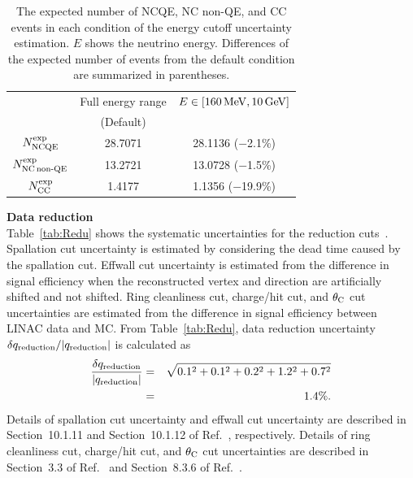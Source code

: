 \begin{table}[h]
	\centering
	\caption[The expected number of NCQE, NC non-QE, and CC events in each condition of the energy cutoff uncertainty estimation]{
	The expected number of NCQE, NC non-QE, and CC events in each condition of the energy cutoff uncertainty estimation.
	$E$ shows the neutrino energy.
	Differences of the expected number of events from the default condition are summarized in parentheses.
	}\label{tab:Cutoff}
	\vs
	\begin{tabular}{ccc} \hline \hline
		                                         & Full energy range & $E\in [160\,{\rm MeV}, 10\,{\rm GeV}]$ \\
		                                         & (Default)         &                                        \\ \hline
		$N^{\rm exp}_{\rm NCQE}$                 & 28.7071           & 28.1136 ($-$2.1\%)                     \\
		$N^{\rm exp}_{\rm NC\,non\mathchar`-QE}$ & 13.2721           & 13.0728 ($-$1.5\%)                     \\
		$N^{\rm exp}_{\rm CC}$                   & 1.4177            & 1.1356 ($-$19.9\%)                     \\ \hline \hline
	\end{tabular}
\end{table}

\textbf{Data reduction}\\
\hs
Table~\ref{tab:Redu} shows the systematic uncertainties for the reduction cuts~\cite{2021Abe}.
Spallation cut uncertainty is estimated by considering the dead time caused by the spallation cut.
Effwall cut uncertainty is estimated from the difference in signal efficiency when the reconstructed vertex and direction are artificially shifted and not shifted.
Ring cleanliness cut, charge/hit cut, and $\theta_{\rm C}$ cut uncertainties are estimated from the difference in signal efficiency between LINAC data and MC.
From Table~\ref{tab:Redu}, data reduction uncertainty $\delta q_{\rm reduction}/|q_{\rm reduction}|$ is calculated as
\begin{eqnarray}
	{\delta q_{\rm reduction} \over |q_{\rm reduction}|} &=& \sqrt{0.1^2 + 0.1^2 + 0.2^2 + 1.2^2 + 0.7^2} \nonumber \\
																											 &=& 1.4\%.
\end{eqnarray}
Details of spallation cut uncertainty and effwall cut uncertainty are described in Section~10.1.11 and Section~10.1.12 of Ref.~\cite{2015NakanoPhD}, respectively.
Details of ring cleanliness cut, charge/hit cut, and $\theta_{\rm C}$ cut uncertainties are described in Section~3.3 of Ref.~\cite{2020Hedri} and Section~8.3.6 of Ref.~\cite{2023HaradaPhD}.\\

